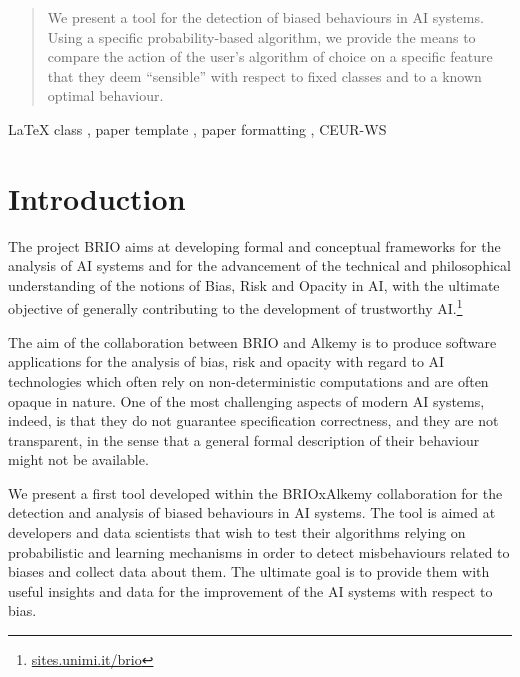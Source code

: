\documentclass[
]{ceurart}
\begin{document}
\begin{abstract}
We present a tool for the detection of biased behaviours in AI systems. Using a specific probability-based algorithm,
we provide the means to compare the action of the user's algorithm of choice on a specific feature that they deem ``sensible'' with respect to fixed classes and to a known optimal behaviour.
\end{abstract}

\begin{keywords}
  LaTeX class \sep
  paper template \sep
  paper formatting \sep
  CEUR-WS
\end{keywords}

\maketitle

\section{Introduction}
\label{sec:intro}


The project BRIO aims at developing formal and conceptual frameworks for the analysis of AI systems and for the advancement of the technical and philosophical understanding of the notions of Bias, Risk and Opacity in AI, with the ultimate objective of generally contributing to the development of trustworthy AI.\footnote{\url{sites.unimi.it/brio}} 

The aim of the collaboration between BRIO and Alkemy is to produce software applications for the analysis of bias, risk and opacity with regard to AI technologies which often rely on non-deterministic computations and  are often opaque in nature. One of the most challenging aspects of modern AI systems, indeed, is that they do not guarantee specification correctness, and they are not transparent, in the sense that a general formal description of their behaviour might not be available.

We present a first tool developed within the BRIOxAlkemy collaboration for the detection and analysis of biased behaviours in AI systems. The tool is aimed at developers and data scientists that wish to test their algorithms relying on probabilistic and learning mechanisms in order to detect misbehaviours related to biases and collect data about them. The ultimate goal is to provide them with useful insights and data for the improvement of the AI systems with respect to bias.
\end{document}
